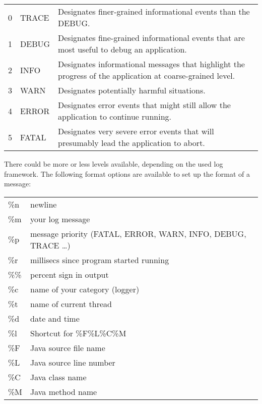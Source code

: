 \begin{tabularx}{\linewidth}{llX}
0 & TRACE & Designates finer-grained informational events than the DEBUG. \\
1 & DEBUG & Designates fine-grained informational events that are most useful to debug an application.\\
2 & INFO & Designates informational messages that highlight the progress of the application at coarse-grained level.\\
3 & WARN & Designates potentially harmful situations.\\
4 & ERROR & Designates error events that might still allow the application to continue running.\\
5 & FATAL & Designates very severe error events that will presumably lead the application to abort.\\
\end{tabularx}

There could be more or less levels available, depending on the
used log framework.
The following format options are available to set up the format
of a message:


\begin{tabularx}{\linewidth}{lX}
\%n & newline\\
\%m & your log message\\
\%p & message priority (FATAL, ERROR, WARN, INFO, DEBUG, TRACE \ldots)\\
\%r & millisecs since program started running\\
\%\% & percent sign in output\\
\%c & name of your category (logger)\\
\%t & name of current thread\\
\%d & date and time\\
\%l & Shortcut for \%F\%L\%C\%M\\
\%F & Java source file name\\
\%L & Java source line number\\
\%C & Java class name\\
\%M & Java method name\\
\end{tabularx}
%

